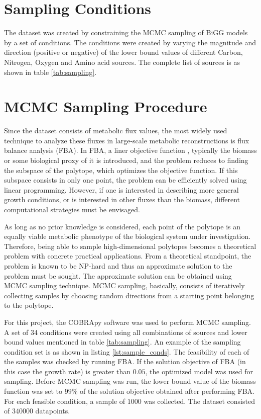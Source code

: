 \documentclass[12pt,chapterheads]{ucsd}
\begin{document}
\section{Sampling Conditions}
The dataset was created by constraining the MCMC sampling of BiGG models by a set of conditions. The conditions were created by varying the magnitude and direction (positive or negative) of the lower bound values of different Carbon, Nitrogen, Oxygen and Amino acid sources. The complete list of sources is as shown in table \ref{tab:sampling}.  

\section{MCMC Sampling Procedure}
Since the dataset consists of metabolic flux values, the most widely used technique to analyze these fluxes in large-scale metabolic reconstructions is flux balance analysis (FBA). In FBA, a liner objective function , typically the biomass or some biological proxy of it is introduced, and the problem reduces to finding the subspace of the polytope, which optimizes the objective function. If this subspace consists in only one point, the problem can be efficiently solved using linear programming. However, if one is interested in describing more general growth conditions, or is interested in other fluxes than the biomass, different computational strategies must be envisaged. 

As long as no prior knowledge is considered, each point of the polytope is an equally viable metabolic phenotype of the biological system under investigation. Therefore, being able to sample high-dimensional polytopes becomes a theoretical problem with concrete practical applications. From a theoretical standpoint, the problem is known to be NP-hard and thus an approximate solution to the problem must be sought. The approximate solution can be obtained using MCMC sampling technique. MCMC sampling, basically, consists of iteratively collecting samples by choosing random directions from a starting point belonging to the polytope.

For this project, the COBRApy \cite{Ebrahim2013} software was used to perform MCMC sampling. A set of 34 conditions were created using all combinations of sources and lower bound values mentioned in table \ref{tab:sampling}. An example of the sampling condition set is as shown in listing \ref{lst:sample_conds}. The feasibility of each of the samples was checked by running FBA. If the solution objective of FBA (in this case the growth rate) is greater than $0.05$, the optimized model was used for sampling. Before MCMC sampling was run, the lower bound value of the biomass function was set to $99\%$ of the solution objective obtained after performing FBA. For each feasible condition, a sample of $1000$ was collected. The dataset consisted of $340000$ datapoints.
\end{document}
